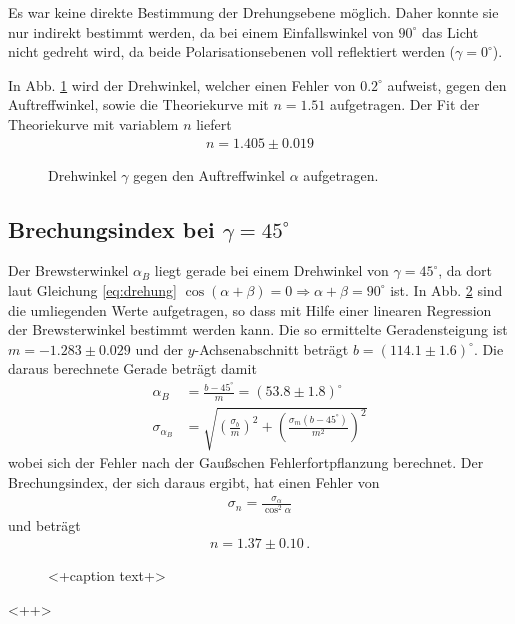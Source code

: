 \documentclass[12pt,a4paper,titlepage,headinclude,bibtotoc]{scrartcl}
\begin{document}
Es war keine direkte Bestimmung der Drehungsebene möglich.
Daher konnte sie nur indirekt bestimmt werden, da bei einem Einfallswinkel von $90^\circ$ das Licht nicht gedreht wird, da beide Polarisationsebenen voll reflektiert werden ($\gamma=0^\circ$).

In Abb. \ref{fig:drehung} wird der Drehwinkel, welcher einen Fehler von $0.2^\circ$ aufweist, gegen den Auftreffwinkel, sowie die Theoriekurve mit $n=1.51$ aufgetragen.
Der Fit der Theoriekurve mit variablem $n$ liefert
\begin{align*}
	n=1.405\pm 0.019
\end{align*}
\begin{figure}[h]
	\centering
	
	\caption{Drehwinkel $\gamma$ gegen den Auftreffwinkel $\alpha$ aufgetragen.}
	\label{fig:drehung}
\end{figure}

\subsection{Brechungsindex bei $\gamma=45^\circ$}
Der Brewsterwinkel $\alpha_B$ liegt gerade bei einem Drehwinkel von $\gamma=45^\circ$, da dort laut Gleichung \eqref{eq:drehung} $\cos (\alpha + \beta) = 0 \Rightarrow \alpha + \beta = 90^\circ$ ist.
In Abb. \ref{fig:brewster} sind die umliegenden Werte aufgetragen, so dass mit Hilfe einer linearen Regression der Brewsterwinkel bestimmt werden kann.
Die so ermittelte Geradensteigung ist $m=-1.283\pm 0.029$ und der $y$-Achsenabschnitt beträgt $b=(114.1\pm 1.6)^\circ$.
Die daraus berechnete Gerade beträgt damit
\begin{align}
	\alpha_B&=\frac{b-45^\circ}{m} = (53.8\pm 1.8)^\circ\\
	\sigma_{\alpha_B}&=\sqrt{\left( \frac{\sigma_b}{m} \right)^2 + \left( \frac{\sigma_m(b-45^\circ)}{m^2} \right)^2}
\end{align}
wobei sich der Fehler nach der Gaußschen Fehlerfortpflanzung berechnet.
Der Brechungsindex, der sich daraus ergibt, hat einen Fehler von
\begin{align*}
	\sigma_n=\frac{\sigma_\alpha}{\cos ^2\alpha}
\end{align*}
und beträgt 
\begin{align}
	n=1.37\pm 0.10\, .
\end{align}



\begin{figure}[h]
	\centering
	
	\caption{<+caption text+>}
	\label{fig:brewster}
\end{figure}<++>
\end{document}
